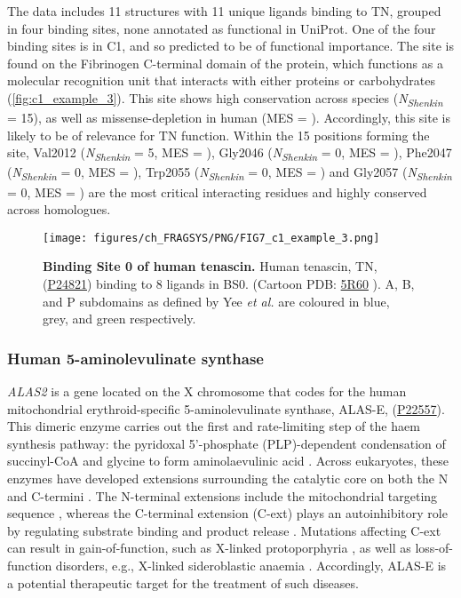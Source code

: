 The data includes 11 structures with 11 unique ligands binding to TN, grouped in four binding sites, none annotated as functional in UniProt. One of the four binding sites is in C1, and so predicted to be of functional importance. The site is found on the Fibrinogen C-terminal domain of the protein, which functions as a molecular recognition unit that interacts with either proteins or carbohydrates (\autoref{fig:c1_example_3}). This site shows high conservation across species (\textit{N\textsubscript{Shenkin}} = 15), as well as missense-depletion in human (MES = ). Accordingly, this site is likely to be of relevance for TN function. Within the 15 positions forming the site, Val2012 (\textit{N\textsubscript{Shenkin}} = 5, MES = ), Gly2046 (\textit{N\textsubscript{Shenkin}} = 0, MES = ), Phe2047 (\textit{N\textsubscript{Shenkin}} = 0, MES = ), Trp2055 (\textit{N\textsubscript{Shenkin}} = 0, MES = ) and Gly2057 (\textit{N\textsubscript{Shenkin}} = 0, MES = ) are the most critical interacting residues and highly conserved across homologues.

\begin{figure}[htb!]
    \centering
    \texttt{[image: figures/ch\_FRAGSYS/PNG/FIG7\_c1\_example\_3.png]}
    \caption[Binding Site 0 of human tenascin]{\textbf{Binding Site 0 of human tenascin.} Human tenascin, TN, (\href{https://www.uniprot.org/uniprotkb/P24821/entry}{P24821}) binding to 8 ligands in BS0. (Cartoon PDB: \href{https://www.ebi.ac.uk/pdbe/entry/pdb/5r60}{5R60} \cite{PDB_5R60}). A, B, and P subdomains as defined by Yee \textit{et al.} \cite{YEE_1997_FIBRINOGEN} are coloured in blue, grey, and green respectively.}
    \label{fig:c1_example_3}
\end{figure}

\subsubsection{Human 5-aminolevulinate synthase}

\textit{ALAS2} is a gene located on the X chromosome that codes for the human mitochondrial erythroid-specific 5-aminolevulinate synthase, ALAS-E, (\href{https://www.uniprot.org/uniprotkb/P22557/entry}{P22557}). This dimeric enzyme carries out the first and rate-limiting step of the haem synthesis pathway: the pyridoxal 5’-phosphate (PLP)-dependent condensation of succinyl-CoA and glycine to form aminolaevulinic acid \cite{AKHTAR_1976_PORPHYRIN}. Across eukaryotes, these enzymes have developed extensions surrounding the catalytic core on both the N and C-termini \cite{MUNAKATA_1993_AMINOLEVULINATE}. The N-terminal extensions include the mitochondrial targeting sequence \cite{SRIVASTAVA_1988_AMINOLEVULINATE}, whereas the C-terminal extension (C-ext) plays an autoinhibitory role by regulating substrate binding and product release \cite{BAILEY_2020_AMINOLEVULINATE}. Mutations affecting C-ext can result in gain-of-function, such as X-linked protoporphyria \cite{WHATLEY_2008_AMINOLEVULINATE}, as well as loss-of-function disorders, e.g., X-linked sideroblastic anaemia \cite{DUCAMP_2011_SIDEROBLASTIC}. Accordingly, ALAS-E is a potential therapeutic target for the treatment of such diseases.

